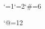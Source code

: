 
\catcode`{=1\catcode`}=2\catcode`#=6%
\def\domap#1{\vbox to \the\textheight{\vfil\noindent\hfil\XeTeXpdffile #1 width \the\textwidth \hfil\par\vfil}\eject}%

\catcode `@=12

